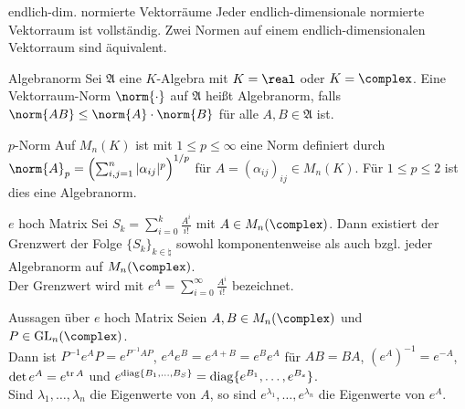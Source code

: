 \begin{Satz}{endlich-dim. normierte Vektorräume}
    Jeder endlich-dimensionale normierte Vektorraum ist vollständig.
    Zwei Normen auf einem endlich-dimensionalen Vektorraum sind äquivalent.
\end{Satz}

\begin{Def}{Algebranorm}
    Sei $\mathfrak{A}$ eine $K$-Algebra mit $K = \real$ oder $K = \complex$.
    Eine Vektorraum-Norm $\norm{\cdot}$ auf $\mathfrak{A}$ heißt Algebranorm,
    falls $\norm{AB} \le \norm{A} \cdot \norm{B}$ für alle
    $A, B \in \mathfrak{A}$ ist.
\end{Def}

\begin{Def}{$p$-Norm}
    Auf $M_n(K)$ ist mit $1 \le p \le \infty$ eine Norm definiert durch
    $\norm{A}_p = \left(\sum_{i,j=1}^n |\alpha_{ij}|^p\right)^{1/p}$
    für $A = (\alpha_{ij})_{ij} \in M_n(K)$.
    Für $1 \le p \le 2$ ist dies eine Algebranorm.
\end{Def}

\begin{Def}{$e$ hoch Matrix}
    Sei $S_k = \sum_{i=0}^k \frac{A^i}{i!}$ mit $A \in M_n(\complex)$.
    Dann existiert der Grenzwert der Folge $\{S_k\}_{k \in \natural}$ sowohl
    komponentenweise als auch bzgl. jeder Algebranorm auf $M_n(\complex)$. \\
    Der Grenzwert wird mit $e^A = \sum_{i=0}^\infty \frac{A^i}{i!}$
    bezeichnet.
\end{Def}

\begin{Satz}{Aussagen über $e$ hoch Matrix}
    Seien $A, B \in M_n(\complex)$ und $P \in \GL_n(\complex)$. \\
    Dann ist $P^{-1} e^A P = e^{P^{-1} A P}$, \qquad
    $e^A e^B = e^{A + B} = e^B e^A$ für $AB = BA$, \qquad
    $(e^A)^{-1} = e^{-A}$, \\
    $\det e^A = e^{\operatorname{tr} A}$ \quad und \quad
    $e^{\operatorname{diag}\{B_1, \dotsc, B_S\}} = \operatorname{diag}\{e^{B_1}, \dotsc, e^{B_s}\}$. \\
    Sind $\lambda_1, \dotsc, \lambda_n$ die Eigenwerte von $A$, so sind 
    $e^{\lambda_1}, \dotsc, e^{\lambda_n}$ die Eigenwerte von $e^A$.
\end{Satz}

